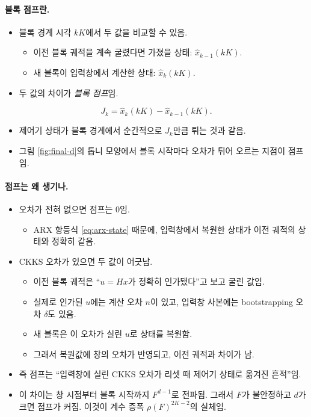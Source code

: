 \documentclass[11pt,a4paper]{article}
\begin{document}
\paragraph{블록 점프란.}
\begin{itemize}
\item 블록 경계 시각 $kK$에서 두 값을 비교할 수 있음.
  \begin{itemize}
  \item 이전 블록 궤적을 계속 굴렸다면 가졌을 상태: $\hat x_{k-1}(kK)$.
  \item 새 블록이 입력창에서 계산한 상태: $\hat x_k(kK)$.
  \end{itemize}
\item 두 값의 차이가 \emph{블록 점프}임.
\end{itemize}
\begin{equation}
J_k=\hat x_k(kK)-\hat x_{k-1}(kK).
\end{equation}
\begin{itemize}
\item 제어기 상태가 블록 경계에서 순간적으로 $J_k$만큼 튀는 것과 같음.
\item 그림 \ref{fig:final-d}의 톱니 모양에서 블록 시작마다 오차가 튀어 오르는 지점이 점프임.
\end{itemize}

\paragraph{점프는 왜 생기나.}
\begin{itemize}
\item 오차가 전혀 없으면 점프는 0임.
  \begin{itemize}
  \item ARX 항등식 \eqref{eq:arx-state} 때문에, 입력창에서 복원한 상태가 이전 궤적의 상태와 정확히 같음.
  \end{itemize}
\item CKKS 오차가 있으면 두 값이 어긋남.
  \begin{itemize}
  \item 이전 블록 궤적은 ``$u=Hx$가 정확히 인가됐다''고 보고 굴린 값임.
  \item 실제로 인가된 $u$에는 계산 오차 $n$이 있고, 입력창 사본에는 bootstrapping 오차 $\delta$도 있음.
  \item 새 블록은 이 오차가 실린 $u$로 상태를 복원함.
  \item 그래서 복원값에 창의 오차가 반영되고, 이전 궤적과 차이가 남.
  \end{itemize}
\item 즉 점프는 ``입력창에 실린 CKKS 오차가 리셋 때 제어기 상태로 옮겨진 흔적''임.
\item 이 차이는 창 시점부터 블록 시작까지 $F^{d-1}$로 전파됨. 그래서 $F$가 불안정하고 $d$가 크면 점프가 커짐.
      이것이 계수 증폭 $\rho(F)^{2K-2}$의 실체임.
\end{itemize}
\end{document}
